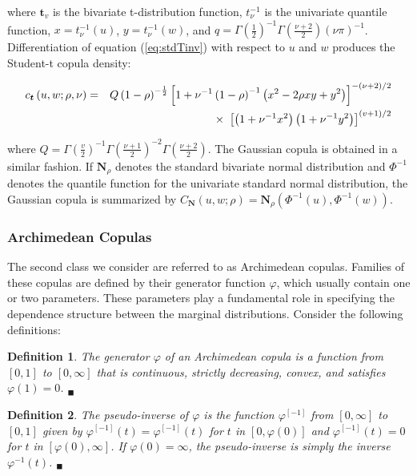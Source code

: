 \documentclass[12pt]{article}
\newtheorem{defn}{Definition}
\begin{document}
where $\boldsymbol{t}_{v}$ is the bivariate t-distribution function, $t_{\nu}^{-1}$ is the univariate quantile function, $x = t_{\nu}^{-1}\left(u\right)$, $y = t_{\nu }^{-1}\left(w\right)$, and $q = \Gamma\left(\frac{1}{2}\right)^{-1}\Gamma\left(\frac{\nu +2}{2}\right)\left(\nu\pi\right)^{-1}$. Differentiation of equation (\ref{eq:stdTinv}) with respect to $u$ and $w$ produces the Student-t copula density:

\begin{eqnarray}
	c_{\boldsymbol{t}}\left(u,w;\rho,\nu\right) &=& Q\left(1-\rho\right)^{-\frac{1}{2}}\left[1+\nu^{-1}\left(1-\rho\right)^{-1}\left(x^{2}-2\rho xy+y^{2}\right)\right]^{-\left(\nu +2\right)/2} \notag \\
	&& \times~\left[\left(1+\nu^{-1}x^{2}\right)\left(1+\nu^{-1}y^{2}\right)\right]^{\left(v+1\right)/2}
\end{eqnarray}

where $Q=\Gamma\left(\frac{v}{2}\right)^{-1}\Gamma\left(\frac{\nu +1}{2}\right)^{-2}\Gamma\left(\frac{\nu +2}{2}\right)$. The Gaussian copula is obtained in a similar fashion. If $\boldsymbol{N}_{\rho}$ denotes the standard bivariate normal distribution and $\Phi^{-1}$ denotes the quantile function for the univariate standard normal distribution, the Gaussian copula is summarized by $C_{\boldsymbol{N}}\left(u,w;\rho\right) = \boldsymbol{N}_{\rho}\left(\Phi^{-1}\left(u\right),\Phi^{-1}\left(w\right)\right)$.

\subsubsection{Archimedean Copulas}

The second class we consider are referred to as Archimedean copulas. Families of these copulas are defined by their generator function $\varphi$, which usually contain one or two parameters. These parameters play a fundamental role in specifying the dependence structure between the marginal distributions. Consider the following definitions:

\begin{defn} \label{def:Arch1}
	The generator $\varphi$ of an Archimedean copula is a function from $\left[0,1\right]$ to $\left[0,\infty\right]$ that is continuous, strictly decreasing, convex, and satisfies $\varphi\left(1\right) = 0$. $_{\blacksquare}$
\end{defn}

\begin{defn} \label{def:Arch2}
	The pseudo-inverse of $\varphi$ is the function $\varphi^{\left[-1\right]}$ from $\left[0,\infty\right]$ to $\left[0,1\right]$ given by $\varphi^{\left[-1\right]}\left(t\right) = \varphi^{\left[-1\right]}\left(t\right)$ for $t$ in $\left[0,\varphi\left(0\right)\right]$ and $\varphi^{\left[-1\right]}\left(t\right) = 0$ for $t$ in $\left[\varphi\left(0\right),\infty\right]$. If $\varphi\left(0\right) = \infty$, the pseudo-inverse is simply the inverse $\varphi^{-1}\left(t\right)$. $_{\blacksquare}$
\end{defn}
\end{document}
